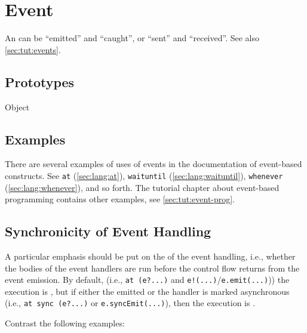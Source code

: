 
\section{Event}

An  can be ``emitted'' and ``caught'', or ``sent'' and
``received''.  See also \autoref{sec:tut:events}.

\subsection{Prototypes}
\begin{refObjects}
\item[Object]
\end{refObjects}

\subsection{Examples}

There are several examples of uses of events in the documentation of
event-based constructs.  See \lstinline{at} (\autoref{sec:lang:at}),
\lstinline{waituntil} (\autoref{sec:lang:waituntil}), \lstinline{whenever}
(\autoref{sec:lang:whenever}), and so forth.  The tutorial chapter about
event-based programming contains other examples, see
\autoref{sec:tut:event-prog}.

\subsection{Synchronicity of Event Handling}
\label{sec:event:sync}
A particular emphasis should be put on the  of the event
handling, i.e., whether the bodies of the event handlers are run before the
control flow returns from the event emission.  By default, (i.e.,
\lstinline|at (e?...)| and \lstinline|e!(...)|/\lstinline|e.emit(...)|)) the
execution is , but if either the emitted or the handler is
marked asynchronous (i.e., \lstinline|at sync (e?...)| or
\lstinline|e.syncEmit(...)|), then the execution is .

Contrast the following examples:

